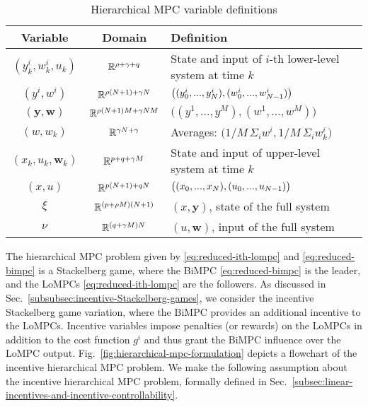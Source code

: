 \begin{table}[tbp]
\setlength\extrarowheight{2pt}
\caption{Hierarchical MPC variable definitions}\label{tab:hierarchical-mpc-variable-definitions}
\begin{tabularx}{\columnwidth}{|c|c|L|}
\hline
Variable & Domain & Definition \\ \hline
$(y^i_k, w^i_k, u_k)$ & $\mathbb{R}^{\rho+\gamma+q}$ & State and input of $i$-th lower-level system at time $k$ \\
$(y^i, w^i)$ & $\mathbb{R}^{\rho(N+1)+\gamma N}$ & $\bigl((y^i_0, ..., y^i_N), (w^i_0, ..., w^i_{N-1})\bigr)$ \\
$(\bm{y}, \bm{w})$ & $\mathbb{R}^{\rho(N+1) M+\gamma N M}$ & $\bigl((y^1, ..., y^M), (w^1, ..., w^M)\bigr)$ \\
$(w, w_k)$ & $\mathbb{R}^{\gamma N+\gamma}$ & Averages: $\bigl(1/M \, \Sigma_i w^i, 1/M \, \Sigma_i w^i_k\bigr)$ \\ \hline
$(x_k, u_k, \bm{w}_k)$ & $\mathbb{R}^{p+q+\gamma M}$ & State and input of upper-level system at time $k$ \\
$(x, u)$ & $\mathbb{R}^{p(N+1)+qN}$ & $\bigl((x_0, ..., x_N), (u_0, ..., u_{N-1})\bigr)$ \\ \hline
$\xi$ & $\mathbb{R}^{(p+\rho M)(N+1)}$ & $(x, \bm{y})$, state of the full system \\
$\nu$ & $\mathbb{R}^{(q+\gamma M)N}$ & $(u, \bm{w})$, input of the full system \\
\hline
\end{tabularx}
\end{table}

The hierarchical MPC problem given by \eqref{eq:reduced-ith-lompc} and \eqref{eq:reduced-bimpc} is a Stackelberg game, where the BiMPC \eqref{eq:reduced-bimpc} is the leader, and the LoMPCs \eqref{eq:reduced-ith-lompc} are the followers.
As discussed in Sec.~\ref{subsubsec:incentive-Stackelberg-games}, we consider the incentive Stackelberg game variation, where the BiMPC provides an additional incentive to the LoMPCs.
Incentive variables impose penalties (or rewards) on the LoMPCs in addition to the cost function $g^i$ and thus grant the BiMPC influence over the LoMPC output.
Fig.~\ref{fig:hierarchical-mpc-formulation} depicts a flowchart of the incentive hierarchical MPC problem.
We make the following assumption about the incentive hierarchical MPC problem, formally defined in Sec.~\ref{subsec:linear-incentives-and-incentive-controllability}.

